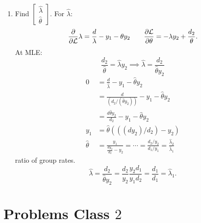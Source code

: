 \documentclass[10pt, a4paper]{article}
\begin{document}
\begin{problem}
\begin{solution}
\begin{enumerate}[label = (\alph*)]
            \item
            Find $\begin{bmatrix}
                \hat{\lambda} \\ \hat{\theta}
            \end{bmatrix}$.
            For $\hat{\lambda}$:
            \[
            \pd{\mathcal{L}}{\lambda} = \frac{d}{\lambda} - y_1 - \theta y_2\qquad\pd[\mathcal{L}]{\theta} = -\lambda y_2 + \frac{d_2}{\theta}.
            \]
            At MLE:
            \[
            \frac{d_2}{\hat{\theta}} = \hat{\lambda} y_2 \implies \hat{\lambda} = \frac{d_2}{\hat{\theta}y_2}
            \]
            \begin{align*}
                0 &= \frac{d}{\hat{\lambda}} - y_1 - \hat{\theta}y_2 \\
                &= \frac{d}{(d_2 / (\hat{\theta}y_2))} - y_1 - \hat{\theta}y_2 \\
                &= \frac{d\hat{\theta}y_2}{d_2} - y_1 - \hat{\theta}y_2 \\
                y_1 &= \hat{\theta}(((dy_2) / d_2) - y_2) \\
                \hat{\theta} &= \frac{y_1}{\frac{dy_2}{d_2} - y_2} = \dotsi = \frac{d_2 / y_2}{d_1 / y_1} = \frac{\hat{\lambda}_2}{\hat{\lambda}_1}
            \end{align*}
            ratio of group rates.
            \[
            \hat{\lambda} = \frac{d_2}{\hat{\theta}y_2} = \frac{d_2}{y_2}\frac{y_2d_1}{y_1d_2} = \frac{d_1}{d_1} = \hat{\lambda}_1.
            \]
        \end{enumerate}
    \end{solution}
\end{problem}

\newpage

\section{Problems Class \texorpdfstring{$2$}{}}
\end{document}
